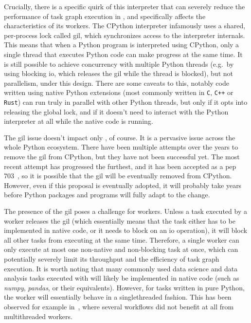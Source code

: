 Crucially, there is a specific quirk of this interpreter that can severely reduce the performance
of task graph execution in \dask{}, and specifically affects the
characteristics of its workers. The CPython interpreter infamously uses a shared, per-process lock
called \gls{gil}, which synchronizes access to the interpreter internals. This
means that when a Python program is interpreted using CPython, only a single thread that executes
Python code can make progress at the same time. It is still possible to achieve concurrency with
multiple Python threads (e.g.\ by using blocking \gls{io}, which releases the
\gls{gil} while the thread is blocked), but not parallelism, under this design.
There are some caveats to this, notably code written using native Python extensions (most commonly
written in \texttt{C}, \texttt{C++} or \texttt{Rust})
can run truly in parallel with other Python threads, but only if it opts into releasing the global
lock, and if it doesn't need to interact with the Python interpreter at all while the native code
is running.

The \gls{gil} issue doesn't impact only \dask{}, of course.
It is a pervasive issue across the whole Python ecosystem. There have been multiple attempts over
the years to remove the \gls{gil} from CPython, but they have not been successful
yet. The most recent attempt has progressed the furthest, and it has been accepted as a
\gls{pep} 703~\cite{pep703}, so it is possible that the
\gls{gil} will be eventually removed from CPython. However, even if this proposal
is eventually adopted, it will probably take years before Python packages and programs will fully
adapt to the change.

The presence of the \gls{gil} poses a challenge for \dask{}
workers. Unless a task executed by a worker releases the \gls{gil} (which essentially means that the task either has to be
implemented in native code, or it needs to block on an \gls{io} operation), it will block
all other tasks from executing at the same time. Therefore, a single \dask{}
worker can only execute at most one non-native and non-blocking task at once, which can potentially
severely limit its throughput and the efficiency of task graph execution. It is worth noting that
many commonly used data science and data analysis tasks executed with \dask{}
will likely be implemented in native code (such as \emph{numpy},
\emph{pandas}, or their \dask{} equivalents). However, for tasks
written in pure Python, the worker will essentially behave in a singlethreaded fashion. This has
been observed for example in~\cite{dasksparkcomparison}, where several workflows did not benefit
at all from multithreaded \dask{} workers.

